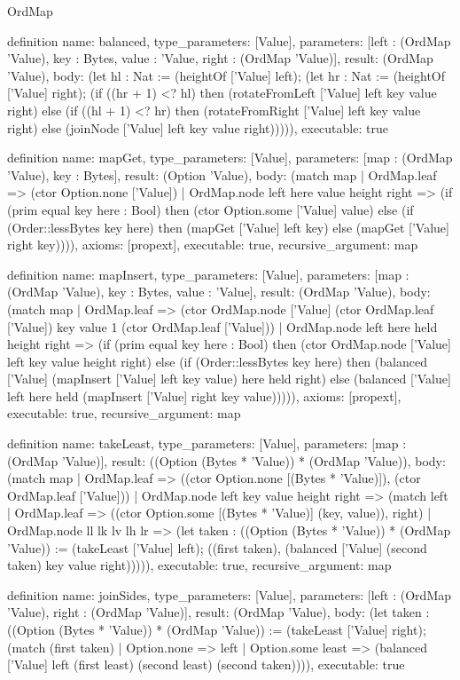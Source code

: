 \begin{lexlean}{OrdMap}
\begin{semanticmodule}
definition{
  name: balanced,
  type_parameters: [Value],
  parameters: [left : (OrdMap 'Value), key : Bytes, value : 'Value, right : (OrdMap 'Value)],
  result: (OrdMap 'Value),
  body: (let hl : Nat := (heightOf ['Value] left); (let hr : Nat := (heightOf ['Value] right); (if ((hr + 1) <? hl) then (rotateFromLeft ['Value] left key value right) else (if ((hl + 1) <? hr) then (rotateFromRight ['Value] left key value right) else (joinNode ['Value] left key value right))))),
  executable: true
}

definition{
  name: mapGet,
  type_parameters: [Value],
  parameters: [map : (OrdMap 'Value), key : Bytes],
  result: (Option 'Value),
  body: (match map
    | OrdMap.leaf => (ctor Option.none ['Value])
    | OrdMap.node left here value height right => (if (prim equal key here : Bool) then (ctor Option.some ['Value] value) else (if (Order::lessBytes key here) then (mapGet ['Value] left key) else (mapGet ['Value] right key)))),
  axioms: [propext],
  executable: true,
  recursive_argument: map
}

definition{
  name: mapInsert,
  type_parameters: [Value],
  parameters: [map : (OrdMap 'Value), key : Bytes, value : 'Value],
  result: (OrdMap 'Value),
  body: (match map
    | OrdMap.leaf => (ctor OrdMap.node ['Value] (ctor OrdMap.leaf ['Value]) key value 1 (ctor OrdMap.leaf ['Value]))
    | OrdMap.node left here held height right => (if (prim equal key here : Bool) then (ctor OrdMap.node ['Value] left key value height right) else (if (Order::lessBytes key here) then (balanced ['Value] (mapInsert ['Value] left key value) here held right) else (balanced ['Value] left here held (mapInsert ['Value] right key value))))),
  axioms: [propext],
  executable: true,
  recursive_argument: map
}

definition{
  name: takeLeast,
  type_parameters: [Value],
  parameters: [map : (OrdMap 'Value)],
  result: ((Option (Bytes * 'Value)) * (OrdMap 'Value)),
  body: (match map
    | OrdMap.leaf => ((ctor Option.none [(Bytes * 'Value)]), (ctor OrdMap.leaf ['Value]))
    | OrdMap.node left key value height right => (match left
      | OrdMap.leaf => ((ctor Option.some [(Bytes * 'Value)] (key, value)), right)
      | OrdMap.node ll lk lv lh lr => (let taken : ((Option (Bytes * 'Value)) * (OrdMap 'Value)) := (takeLeast ['Value] left); ((first taken), (balanced ['Value] (second taken) key value right))))),
  executable: true,
  recursive_argument: map
}

definition{
  name: joinSides,
  type_parameters: [Value],
  parameters: [left : (OrdMap 'Value), right : (OrdMap 'Value)],
  result: (OrdMap 'Value),
  body: (let taken : ((Option (Bytes * 'Value)) * (OrdMap 'Value)) := (takeLeast ['Value] right); (match (first taken)
    | Option.none => left
    | Option.some least => (balanced ['Value] left (first least) (second least) (second taken)))),
  executable: true
}


\end{semanticmodule}
\end{lexlean}
